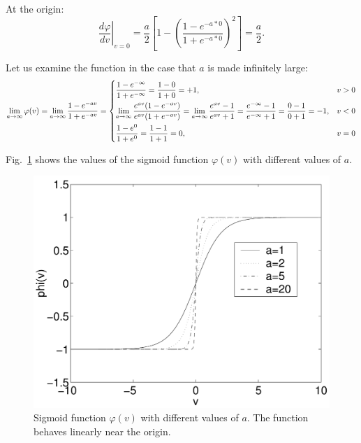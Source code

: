 \begin{enumerate}
\begin{solution}
    At the origin: 
    \begin{equation*}
      \left.\frac{d\varphi}{dv}\right|_{v=0} = \frac{a}{2} \left[1 - \left(
          \frac{1 - e^{-a * 0}}{1 + e^{-a*0}} \right)^2\right] = \frac{a}{2}.
    \end{equation*}

    Let us examine the function in the case that $a$ is made infinitely large:
    \begin{align*}
      \lim_{a\rightarrow\infty} \varphi(v) =
      \lim_{a\rightarrow\infty} \frac{1-e^{-av}}{1+e^{-av}} =
      \begin{dcases}
        \frac{1-e^{-\infty}}{1+e^{-\infty}} = \frac{1-0}{1+0} = +1, & v > 0
        \\
        \lim_{a\rightarrow\infty} \frac{e^{av}(1-e^{-av})}{e^{av}(1+e^{-av})} =
        \lim_{a\rightarrow\infty} \frac{e^{av}-1}{e^{av}+1} =
        \frac{e^{-\infty}-1}{e^{-\infty}+1} = \frac{0-1}{0+1} = -1, & v < 0
        \\
        \frac{1-e^0}{1+e^0} = \frac{1-1}{1+1} = 0, & v = 0
      \end{dcases}
    \end{align*}

    Fig.~\ref{fig:sigmoid} shows the values of the sigmoid function
    $\varphi(v)$ with different values of $a$.

    \begin{figure}[h]
      \begin{center}
        \includegraphics[width=12cm]{sigmoid}
        \caption{\label{fig:sigmoid} Sigmoid function $\varphi(v)$ with
          different values of $a$. The function behaves linearly near the
          origin.}
      \end{center}
    \end{figure}


\end{solution}
\end{enumerate}
